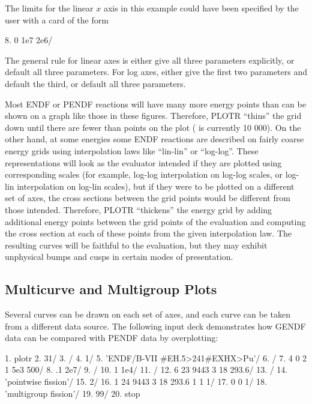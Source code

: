 \noindent
The limits for the linear $x$ axis in this example could have been
specified by the user with a card of the form

\small
\begin{ccode}

   8.  0 1e7 2e6/

\end{ccode}
\normalsize

\noindent
The general rule for linear axes is either give all three parameters
explicitly, or default all three parameters.  For log axes, either
give the first two parameters and default the third, or default all
three parameters.

Most ENDF or PENDF reactions will have many more energy points
than can be shown on a graph like those in these figures.
Therefore, PLOTR ``thins'' the grid down until there are fewer
than  points on the plot ( is currently 10 000).
On the other hand, at some energies some ENDF reactions are described
on fairly coarse energy grids using interpolation laws like
``lin-lin'' or ``log-log''.  These representations will look as the
evaluator intended if they are plotted using corresponding scales
(for example, log-log interpolation on log-log scales, or log-lin
interpolation on log-lin scales), but if they were to be plotted
on a different set of axes, the cross sections between the grid
points would be different from those intended.  Therefore, PLOTR
``thickens'' the energy grid by adding additional energy points
between the grid points of the evaluation and computing the cross
section at each of these points from the given interpolation law.
The resulting curves will be faithful to the evaluation, but they
may exhibit unphysical bumps and cusps in certain modes of
presentation.

\subsection{Multicurve and Multigroup Plots}
\label{ssPLOTR_multi}

Several curves can be drawn on each set of axes, and each curve
can be taken from a different data source.  The following input
deck demonstrates how GENDF data can be compared with PENDF data
by overplotting:

\small
\begin{ccode}

   1.  plotr
   2.  31/
   3.  /
   4.  1/
   5.  'ENDF/B-VII #EH.5>241#EXHX>Pu'/
   6.  /
   7.  4 0 2 1 5e3 500/
   8.  .1 2e7/
   9.  /
  10.  1 1e4/
  11.  /
  12.  6 23 9443 3 18 293.6/
  13.  /
  14.  'pointwise fission'/
  15.  2/
  16.  1 24 9443 3 18 293.6 1 1 1/
  17.  0 0 1/
  18.  'multigroup fission'/
  19.  99/
  20.  stop

\end{ccode}
\normalsize

